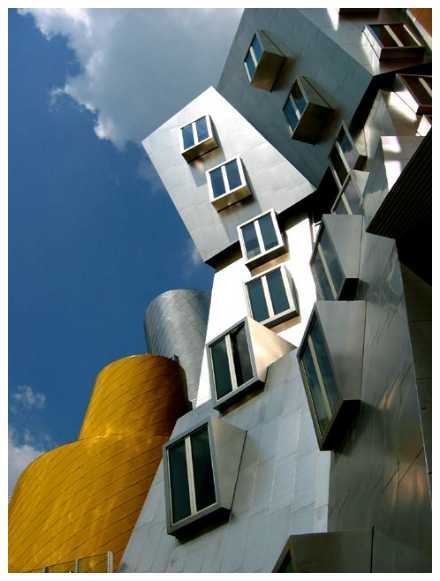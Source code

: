 \documentclass[12pt]{amsart}
\begin{document}
\begin{figure}
\includegraphics[width=\linewidth]{stata_center.jpg}
\endminipage\hfill
{}

\end{figure}
\end{document}
